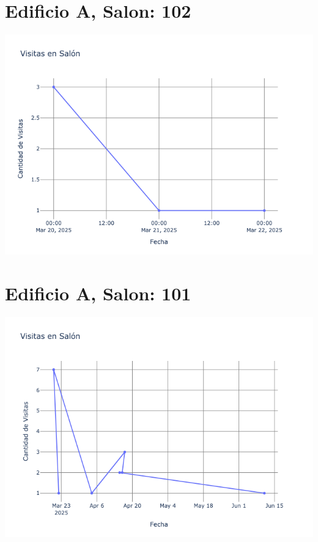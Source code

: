 \documentclass{article}
\begin{document}
    \section{Edificio A, Salon: 102}
    \noindent
    \begin{minipage}{0.48\textwidth}
        \centering
        \includegraphics[width=\textwidth]{../img/poli/VS102-180Dias-24-08-2025.png}
    \end{minipage}
    

    \section{Edificio A, Salon: 101}
    \noindent
    \begin{minipage}{0.48\textwidth}
        \centering
        \includegraphics[width=\textwidth]{../img/poli/VS101-180Dias-24-08-2025.png}
    \end{minipage}
    
\end{document}
